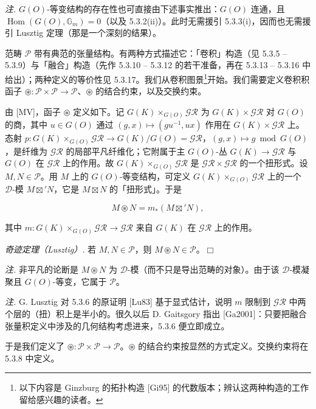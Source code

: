 \emph{注.} $G(O)$-等变结构的存在性也可直接由下述事实推出：$G(O)$ 连通，且 $\operatorname{Hom}(G(O),\mathbb{G}_m)=0$（以及 5.3.2(ii)）。此时无需援引 5.3.3(i)，因而也无需援引 Lusztig 定理（那是一个深刻的结果）。

 范畴 $\mathcal{P}$ 带有典范的张量结构。有两种方式描述它：「卷积」构造（见 5.3.5 -- 5.3.9）与「融合」构造（先作 5.3.10 -- 5.3.12 的若干准备，再在 5.3.13 -- 5.3.16 中给出）；两种定义的等价性见 5.3.17。我们从卷积图景\footnote{以下内容是 Ginzburg 的拓扑构造 [Gi95] 的代数版本；辨认这两种构造的工作留给感兴趣的读者。}开始。我们需要定义卷积积函子 $\circledast:\mathcal{P}\times\mathcal{P}\to\mathcal{P}$、$\circledast$ 的结合约束，以及交换约束。

由 [MV]，函子 $\circledast$ 定义如下。记 $G(K)\times_{G(O)}\mathcal{GR}$ 为 $G(K)\times\mathcal{GR}$ 对 $G(O)$ 的商，其中 $u\in G(O)$ 通过 $(g,x)\mapsto(gu^{-1},ux)$ 作用在 $G(K)\times\mathcal{GR}$ 上。态射 $p:G(K)\times_{G(O)}\mathcal{GR}\to G(K)/G(O)=\mathcal{GR}$，$(g,x)\mapsto g\bmod G(O)$，是纤维为 $\mathcal{GR}$ 的局部平凡纤维化；它附属于主 $G(O)$-丛 $G(K)\to\mathcal{GR}$ 与 $G(O)$ 在 $\mathcal{GR}$ 上的作用。故 $G(K)\times_{G(O)}\mathcal{GR}$ 是 $\mathcal{GR}\times\mathcal{GR}$ 的一个扭形式。设 $M,N\in\mathcal{P}$。用 $M$ 上的 $G(O)$-等变结构，可定义 $G(K)\times_{G(O)}\mathcal{GR}$ 上的一个 $\mathcal{D}$-模 $M\boxtimes'N$，它是 $M\boxtimes N$ 的「扭形式」。于是

\begin{equation}\tag{260}
M\circledast N=m_{*}(M\boxtimes'N),
\end{equation}

其中 $m:G(K)\times_{G(O)}\mathcal{GR}\to\mathcal{GR}$ 来自 $G(K)$ 在 $\mathcal{GR}$ 上的作用。

 \emph{奇迹定理（Lusztig）.} 若 $M,N\in\mathcal{P}$，则 $M\circledast N\in\mathcal{P}$。\hfill$\Box$


\emph{注.} 非平凡的论断是 $M\circledast N$ 为 $\mathcal{D}$-模（而不只是导出范畴的对象）。由于该 $\mathcal{D}$-模凝聚且 $G(O)$-等变，它属于 $\mathcal{P}$。

\emph{注.} G. Lusztig 对 5.3.6 的原证明 [Lu83] 基于显式估计，说明 $m$ 限制到 $\mathcal{GR}$ 中两个层的（扭）积上是半小的。很久以后 D. Gaitsgory 指出 [Ga2001]：只要把融合张量积定义中涉及的几何结构考虑进来，5.3.6 便立即成立。

于是我们定义了 $\circledast:\mathcal{P}\times\mathcal{P}\to\mathcal{P}$。$\circledast$ 的结合约束按显然的方式定义。交换约束将在 5.3.8 中定义。

